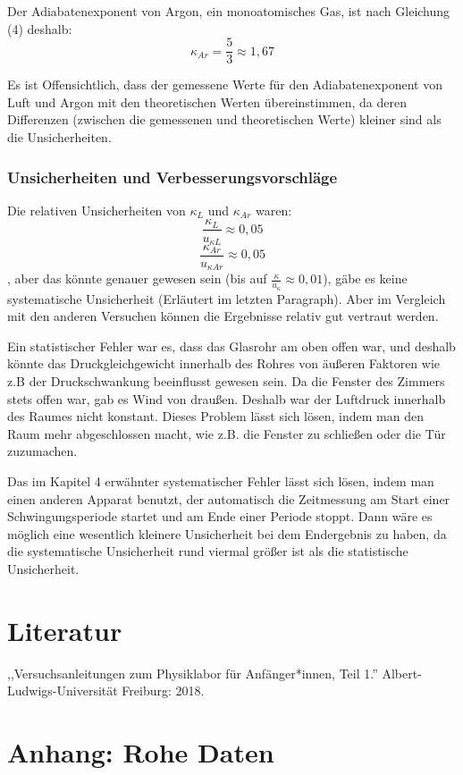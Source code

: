 \documentclass[11pt,a4paper]{article} %
\begin{document}
Der Adiabatenexponent von Argon, ein monoatomisches Gas, ist nach Gleichung (4) deshalb:
$$\kappa_{Ar} = \frac{5}{3} \approx 1,67$$

Es ist Offensichtlich, dass der gemessene Werte für den Adiabatenexponent von Luft und Argon mit den theoretischen Werten übereinstimmen, da deren Differenzen  (zwischen die gemessenen und theoretischen Werte) kleiner sind als die Unsicherheiten. 

\subsubsection{Unsicherheiten  und Verbesserungsvorschläge}
Die relativen Unsicherheiten von $\kappa_L$ und $\kappa_{Ar}$ waren:
$$\frac{\kappa_L}{u_{\kappa L}} \approx 0,05$$
$$\frac{\kappa_{Ar}}{u_{\kappa {Ar}}} \approx 0,05$$
, aber das könnte genauer gewesen sein (bis auf $\frac{\kappa}{u_\kappa} \approx 0,01$), gäbe es keine systematische Unsicherheit (Erläutert im letzten Paragraph). Aber im Vergleich mit den anderen Versuchen können die Ergebnisse relativ gut vertraut werden. 

Ein statistischer Fehler war es, dass das Glasrohr am oben offen war, und deshalb könnte das Druckgleichgewicht innerhalb des Rohres von äußeren Faktoren wie z.B der Druckschwankung beeinflusst gewesen sein. Da die Fenster des Zimmers stets offen war, gab es Wind von draußen. Deshalb war der Luftdruck innerhalb des Raumes nicht konstant. Dieses Problem lässt sich lösen, indem man den Raum mehr abgeschlossen macht, wie z.B. die Fenster zu schließen oder die Tür zuzumachen. 

Das im Kapitel 4 erwähnter systematischer Fehler lässt sich lösen, indem man einen anderen Apparat benutzt, der automatisch die Zeitmessung am Start einer Schwingungsperiode startet und am Ende einer Periode stoppt. Dann wäre es möglich eine wesentlich kleinere Unsicherheit bei dem Endergebnis zu haben, da die systematische Unsicherheit rund viermal größer ist als die statistische Unsicherheit. 

\section{Literatur}
,,Versuchsanleitungen zum Physiklabor für Anfänger*innen, Teil 1.''  Albert-Ludwigs-Universität Freiburg: 2018. 
\newpage
\section{Anhang: Rohe Daten}
\end{document}
